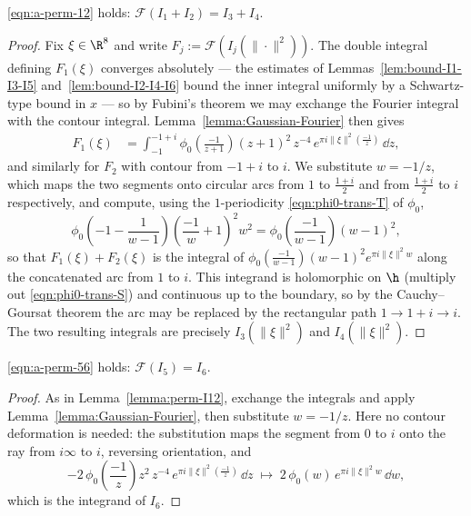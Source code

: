 \begin{lemma}\label{lemma:perm-I12}\leanok
\eqref{eqn:a-perm-12} holds: $\mathcal{F}(I_1 + I_2) = I_3 + I_4$.
\end{lemma}
\begin{proof}
Fix $\xi \in \R^8$ and write $F_j := \mathcal{F}(I_j(\|\cdot\|^2))$. The double integral defining $F_1(\xi)$ converges absolutely --- the estimates of Lemmas~\ref{lem:bound-I1-I3-I5} and~\ref{lem:bound-I2-I4-I6} bound the inner integral uniformly by a Schwartz-type bound in $x$ --- so by Fubini's theorem we may exchange the Fourier integral with the contour integral. Lemma~\ref{lemma:Gaussian-Fourier} then gives
\begin{align}
    F_1(\xi) &= \int_{-1}^{-1+i} \phi_0\left(\frac{-1}{z+1}\right) (z+1)^2\, z^{-4}\, e^{\pi i \|\xi\|^2 (\frac{-1}{z})}\, \dd z,
\end{align}
and similarly for $F_2$ with contour from $-1 + i$ to $i$. We substitute $w = -1/z$, which maps the two segments onto circular arcs from $1$ to $\frac{1+i}{2}$ and from $\frac{1+i}{2}$ to $i$ respectively, and compute, using the $1$-periodicity \eqref{eqn:phi0-trans-T} of $\phi_0$,
\[
    \phi_0\left(-1-\frac{1}{w-1}\right)\left(\frac{-1}{w}+1\right)^2 w^2 = \phi_0\left(\frac{-1}{w-1}\right)(w-1)^2,
\]
so that $F_1(\xi) + F_2(\xi)$ is the integral of $\phi_0\left(\frac{-1}{w-1}\right)(w-1)^2 e^{\pi i \|\xi\|^2 w}$ along the concatenated arc from $1$ to $i$. This integrand is holomorphic on $\h$ (multiply out \eqref{eqn:phi0-trans-S}) and continuous up to the boundary, so by the Cauchy--Goursat theorem the arc may be replaced by the rectangular path $1 \to 1 + i \to i$. The two resulting integrals are precisely $I_3(\|\xi\|^2)$ and $I_4(\|\xi\|^2)$.
\end{proof}

\begin{lemma}\label{lemma:perm-I56}\leanok
\eqref{eqn:a-perm-56} holds: $\mathcal{F}(I_5) = I_6$.
\end{lemma}
\begin{proof}
As in Lemma~\ref{lemma:perm-I12}, exchange the integrals and apply Lemma~\ref{lemma:Gaussian-Fourier}, then substitute $w = -1/z$. Here no contour deformation is needed: the substitution maps the segment from $0$ to $i$ onto the ray from $i\infty$ to $i$, reversing orientation, and
\[
    -2\,\phi_0\left(\frac{-1}{z}\right) z^2\, z^{-4}\, e^{\pi i \|\xi\|^2(\frac{-1}{z})}\,\dd z \;\longmapsto\; 2\,\phi_0(w)\, e^{\pi i \|\xi\|^2 w}\,\dd w,
\]
which is the integrand of $I_6$.
\end{proof}

